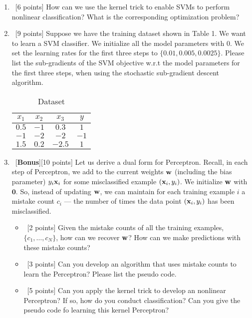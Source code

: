 \documentclass[12pt, fullpage,letterpaper]{article}
\begin{document}
\begin{enumerate}
	
	\item~[6 points] How can we use the kernel trick to enable SVMs to perform nonlinear classification? What is the corresponding optimization problem?

		
	\item~[9 points] Suppose we have the training dataset shown in Table 1. We want to learn a SVM classifier. We initialize all the model parameters with $0$. We set the learning rates for the first three steps to $\{0.01, 0.005, 0.0025\}$.  Please list the sub-gradients of the SVM objective w.r.t the model parameters for the first three steps, when using the stochastic sub-gradient descent algorithm. 
	\begin{table}[h]
		\centering
		\begin{tabular}{ccc|c}
			$x_1$ & $x_2$ & $x_3$ &  $y$\\ 
			\hline\hline
			$0.5$ & $-1$ & $0.3$ & $1$ \\ \hline
			$-1$ & $-2$ & $-2$ & $-1$\\ \hline
			$1.5$ & $0.2$ & $-2.5$ & $1$\\ \hline
		\end{tabular}
	\caption{Dataset}
	\end{table}

	\item~[\textbf{Bonus}][10 points] Let us derive a dual form for Perceptron. Recall, in each step of Perceptron, we add to the current weights ${\bf w}$ (including the bias parameter) $y_i{\bf x}_i$ for some misclassified example $({\bf x}_i, y_i)$. We initialize ${\bf w}$ with $\mathbf{0}$. So, instead of updating ${\bf w}$, we can maintain for each training example $i$ a mistake count $c_i$ --- the number of times the data point $({\bf x}_i, y_i)$ has been misclassified. 
	
	\begin{itemize}
		\item~[2 points] Given the mistake counts of all the training examples, $\{c_1, \ldots, c_N\}$, how can we recover ${\bf w}$? How can we make predictions with these mistake counts? 
		\item~[3 points] Can you develop an algorithm that uses mistake counts to learn the Perceptron? Please list the pseudo code. 
		\item~[5 points] Can you apply the kernel trick to develop an nonlinear Perceptron? If so, how do you conduct classification? Can you give the pseudo code fo learning this kernel Perceptron? 
	\end{itemize}   
	
\end{enumerate}
\end{document}
